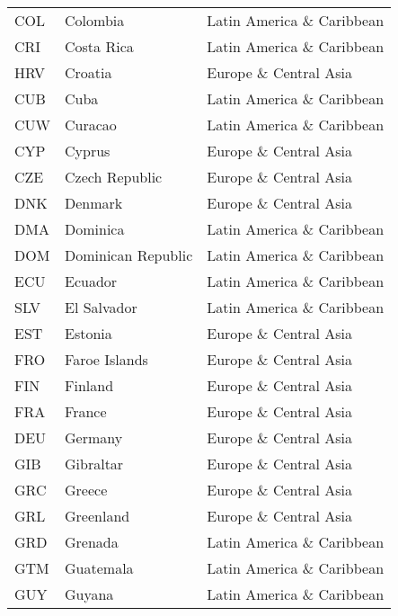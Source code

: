 \documentclass[../main.tex]{subfiles}
\begin{document}
\begin{center}
\begin{longtable}[H]{lll}
COL       & Colombia                       & Latin America \& Caribbean \\
CRI       & Costa Rica                     & Latin America \& Caribbean \\
HRV       & Croatia                        & Europe \& Central Asia     \\
CUB       & Cuba                           & Latin America \& Caribbean \\
CUW       & Curacao                        & Latin America \& Caribbean \\
CYP       & Cyprus                         & Europe \& Central Asia     \\
CZE       & Czech Republic                 & Europe \& Central Asia     \\
DNK       & Denmark                        & Europe \& Central Asia     \\
DMA       & Dominica                       & Latin America \& Caribbean \\
DOM       & Dominican Republic             & Latin America \& Caribbean \\
ECU       & Ecuador                        & Latin America \& Caribbean \\
SLV       & El Salvador                    & Latin America \& Caribbean \\
EST       & Estonia                        & Europe \& Central Asia     \\
FRO       & Faroe Islands                  & Europe \& Central Asia     \\
FIN       & Finland                        & Europe \& Central Asia     \\
FRA       & France                         & Europe \& Central Asia     \\
DEU       & Germany                        & Europe \& Central Asia     \\
GIB       & Gibraltar                      & Europe \& Central Asia     \\
GRC       & Greece                         & Europe \& Central Asia     \\
GRL       & Greenland                      & Europe \& Central Asia     \\
GRD       & Grenada                        & Latin America \& Caribbean \\
GTM       & Guatemala                      & Latin America \& Caribbean \\
GUY       & Guyana                         & Latin America \& Caribbean \\

\end{longtable}
\end{center}
\end{document}
